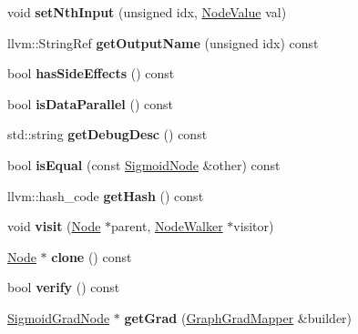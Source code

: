 \begin{DoxyCompactItemize}
void {\bfseries set\+Nth\+Input} (unsigned idx, \hyperlink{structglow_1_1_node_value}{Node\+Value} val)
\item 
\mbox{\label{classglow_1_1_sigmoid_node_a74b1c7e9f17e18ebcb29eb78a31bd207}} 
llvm\+::\+String\+Ref {\bfseries get\+Output\+Name} (unsigned idx) const
\item 
\mbox{\label{classglow_1_1_sigmoid_node_a2df911f828a722bcd848c33407bf8197}} 
bool {\bfseries has\+Side\+Effects} () const
\item 
\mbox{\label{classglow_1_1_sigmoid_node_a381ee3fd53331b6eaacf39489814e9e3}} 
bool {\bfseries is\+Data\+Parallel} () const
\item 
\mbox{\label{classglow_1_1_sigmoid_node_a01711e6ec8884208f258aaabcff30155}} 
std\+::string {\bfseries get\+Debug\+Desc} () const
\item 
\mbox{\label{classglow_1_1_sigmoid_node_a2199893933fca0a442de04940c0401e1}} 
bool {\bfseries is\+Equal} (const \hyperlink{classglow_1_1_sigmoid_node}{Sigmoid\+Node} \&other) const
\item 
\mbox{\label{classglow_1_1_sigmoid_node_abecc155fdb28b95e15d16854cdc84da7}} 
llvm\+::hash\+\_\+code {\bfseries get\+Hash} () const
\item 
\mbox{\label{classglow_1_1_sigmoid_node_aa11a5f85e0e7afce73ab10925674bc62}} 
void {\bfseries visit} (\hyperlink{classglow_1_1_node}{Node} $\ast$parent, \hyperlink{classglow_1_1_node_walker}{Node\+Walker} $\ast$visitor)
\item 
\mbox{\label{classglow_1_1_sigmoid_node_aab8e3a4c3d96a2881f4ef674c9aaaf71}} 
\hyperlink{classglow_1_1_node}{Node} $\ast$ {\bfseries clone} () const
\item 
\mbox{\label{classglow_1_1_sigmoid_node_afc61b82c2be5a034151bab9f9d0d59f9}} 
bool {\bfseries verify} () const
\item 
\mbox{\label{classglow_1_1_sigmoid_node_a228df91beef62fcb80008bd431cead37}} 
\hyperlink{classglow_1_1_sigmoid_grad_node}{Sigmoid\+Grad\+Node} $\ast$ {\bfseries get\+Grad} (\hyperlink{classglow_1_1_graph_grad_mapper}{Graph\+Grad\+Mapper} \&builder)
\end{DoxyCompactItemize}
